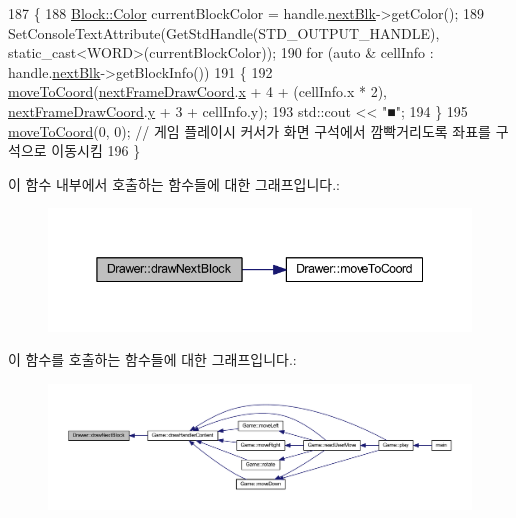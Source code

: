 \begin{DoxyCode}
187     \{
188         \mbox{\hyperlink{class_block_ad054b4ac51df79aa910040b2a2fdf7b5}{Block::Color}} currentBlockColor = handle.\mbox{\hyperlink{class_block_handler_a7a7f96fa7c0d44f9e0fb5e52ebc9c428}{nextBlk}}->getColor();
189         SetConsoleTextAttribute(GetStdHandle(STD\_OUTPUT\_HANDLE), static\_cast<WORD>(currentBlockColor));
190         \textcolor{keywordflow}{for} (\textcolor{keyword}{auto} & cellInfo : handle.\mbox{\hyperlink{class_block_handler_a7a7f96fa7c0d44f9e0fb5e52ebc9c428}{nextBlk}}->getBlockInfo())
191         \{
192             \mbox{\hyperlink{class_drawer_ac1a96e007c07cab2e36a7c78484ee9a6}{moveToCoord}}(\mbox{\hyperlink{tetris__drawer_8h_a83cc61593b9fb64d690139400b3d760b}{nextFrameDrawCoord}}.\mbox{\hyperlink{struct_coord_a696eaa744360fc791d0e3b331c549dbe}{x}} + 4 + (cellInfo.x * 2), 
      \mbox{\hyperlink{tetris__drawer_8h_a83cc61593b9fb64d690139400b3d760b}{nextFrameDrawCoord}}.\mbox{\hyperlink{struct_coord_a214166cca70cef7dda9201689c3e81ab}{y}} + 3 + cellInfo.y);
193             std::cout << \textcolor{stringliteral}{"■"};
194         \}
195         \mbox{\hyperlink{class_drawer_ac1a96e007c07cab2e36a7c78484ee9a6}{moveToCoord}}(0, 0);   \textcolor{comment}{// 게임 플레이시 커서가 화면 구석에서 깜빡거리도록 좌표를 구석으로 이동시킴}
196     \}
\end{DoxyCode}
이 함수 내부에서 호출하는 함수들에 대한 그래프입니다.\+:
\nopagebreak
\begin{figure}[H]
\begin{center}
\leavevmode
\includegraphics[width=345pt]{class_drawer_a6d8f74fa5fae96990547abb2521b5432_cgraph}
\end{center}
\end{figure}
이 함수를 호출하는 함수들에 대한 그래프입니다.\+:
\nopagebreak
\begin{figure}[H]
\begin{center}
\leavevmode
\includegraphics[width=350pt]{class_drawer_a6d8f74fa5fae96990547abb2521b5432_icgraph}
\end{center}
\end{figure}
\mbox{\label{class_drawer_a2deae79fb268b41b72693d005cdf2178}} 
